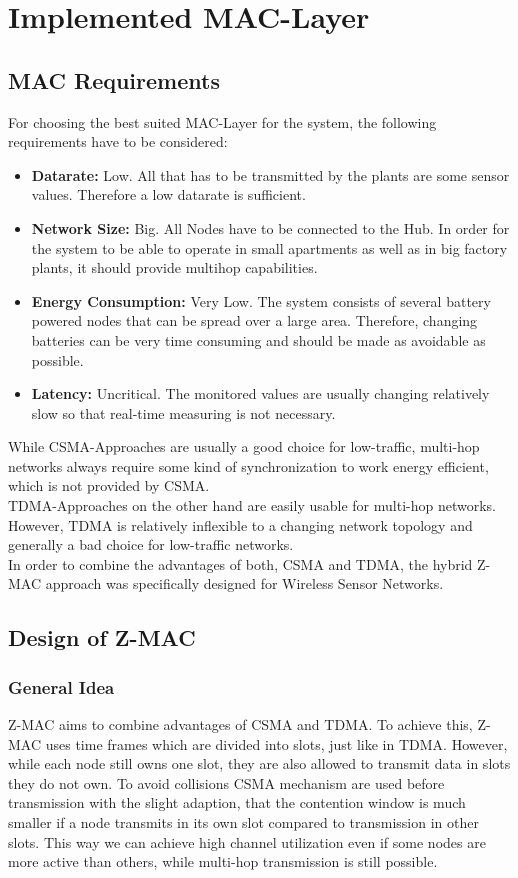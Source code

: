 \section{Implemented MAC-Layer}
\subsection{MAC Requirements}
For choosing the best suited MAC-Layer for the system, the following requirements have to be considered:

\begin{itemize}
	\item \textbf{Datarate:}
	Low. All that has to be transmitted by the plants are some sensor values. Therefore a low datarate is sufficient.
	\item \textbf{Network Size:}
	Big. All Nodes have to be connected to the Hub. In order for the system to be able to operate in small apartments as well as in big factory plants, it should provide multihop capabilities.
	\item \textbf{Energy Consumption:}
	Very Low. The system consists of several battery powered nodes that can be spread over a large area. Therefore, changing batteries can be very time consuming and should be made as avoidable as possible.
	\item \textbf{Latency:}
	Uncritical. The monitored values are usually changing relatively slow so that real-time measuring is not necessary.
\end{itemize}

While CSMA-Approaches are usually a good choice for low-traffic, multi-hop networks always require some kind of synchronization to work energy efficient, which is not provided by CSMA.\\
TDMA-Approaches on the other hand are easily usable for multi-hop networks. However, TDMA is relatively inflexible to a changing network topology and generally a bad choice for low-traffic networks.\\
In order to combine the advantages of both, CSMA and TDMA, the hybrid Z-MAC approach was specifically designed for Wireless Sensor Networks.

\subsection{Design of Z-MAC}
\subsubsection{General Idea}
Z-MAC aims to combine advantages of CSMA and TDMA. To achieve this, Z-MAC uses time frames which are divided into slots, just like in TDMA. However, while each node still owns one slot, they are also allowed to transmit data in slots they do not own. To avoid collisions CSMA mechanism are used before transmission with the slight adaption, that the contention window is much smaller if a node transmits in its own slot compared to transmission in other slots. This way we can achieve high channel utilization even if some nodes are more active than others, while multi-hop transmission is still possible.
